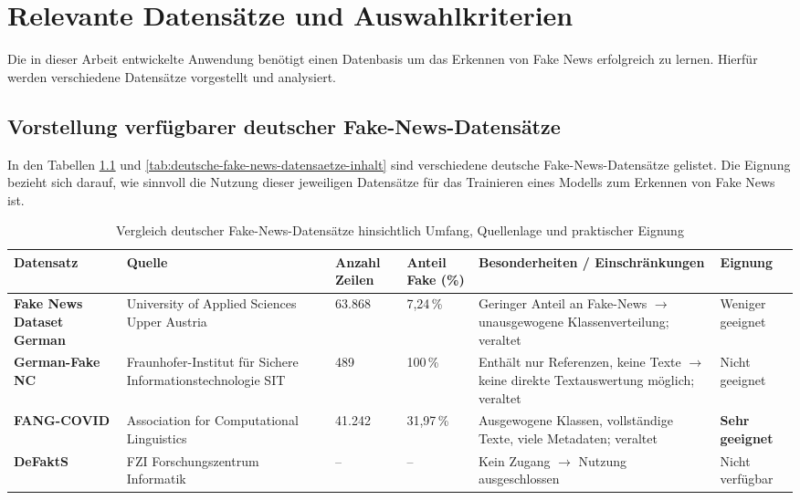 \chapter{Relevante Datensätze und Auswahlkriterien}
\label{chap:relevante_datensaetze_und_auswahlkriterien}

Die in dieser Arbeit entwickelte Anwendung benötigt einen Datenbasis um das Erkennen von Fake News erfolgreich zu lernen.
Hierfür werden verschiedene Datensätze vorgestellt und analysiert.

\section{Vorstellung verfügbarer deutscher Fake-News-Datensätze}
\label{sec:vorstellung_verfuegbare_deutsche_fake_news_datensaetze}

In den Tabellen \ref{tab:deutsche-fake-news-datensaetze} und \ref{tab:deutsche-fake-news-datensaetze-inhalt} sind verschiedene deutsche Fake-News-Datensätze gelistet.
Die Eignung bezieht sich darauf, wie sinnvoll die Nutzung dieser jeweiligen Datensätze für das Trainieren eines Modells zum Erkennen von Fake News ist.

\begin{table}[ht]
    \centering
    \renewcommand{\arraystretch}{1.3}
    \begin{tabular}{|p{1.9cm}|p{2.3cm}|p{1.3cm}|p{1.3cm}|p{3.3cm}|p{1.5cm}|}
        \hline
        \rowcolor{lightgray} \textbf{Datensatz} & \textbf{Quelle} & \textbf{Anzahl Zeilen} & \textbf{Anteil Fake (\%)} & \textbf{Besonderheiten / Einschränkungen} & \textbf{Eignung} \\
        \hline
        \textbf{Fake News Dataset German} & University of Applied Sciences Upper Austria & 63.868 & 7{,}24\,\% & Geringer Anteil an Fake-News $\rightarrow$ unausgewogene Klassenverteilung; veraltet & Weniger geeignet \\
        \hline
        \textbf{German-Fake NC} & Fraunhofer-Institut für Sichere Informationstechnologie SIT & 489 & 100\,\% & Enthält nur Referenzen, keine Texte $\rightarrow$ keine direkte Textauswertung möglich; veraltet & Nicht geeignet \\
        \hline
        \textbf{FANG-COVID} & Association for Computational Linguistics & 41.242 & 31{,}97\,\% & Ausgewogene Klassen, vollständige Texte, viele Metadaten; veraltet & \textbf{Sehr geeignet} \\
        \hline
        \textbf{DeFaktS} & FZI Forschungszentrum Informatik & -- & -- & Kein Zugang $\rightarrow$ Nutzung ausgeschlossen & Nicht verfügbar \\
        \hline
    \end{tabular}
    \caption{Vergleich deutscher Fake-News-Datensätze hinsichtlich Umfang, Quellenlage und praktischer Eignung}
    \label{tab:deutsche-fake-news-datensaetze}
\end{table}

